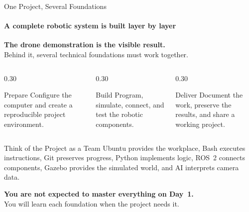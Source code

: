 \begin{frame}{One Project, Several Foundations}
\framesubtitle{A complete robotic system is built layer by layer}

\footnotesize

\begin{center}
    \large
    \textbf{The drone demonstration is the visible result.}\\[0.3em]
    \normalsize
    Behind it, several technical foundations must work together.
\end{center}

\pause

\begin{columns}[T,onlytextwidth]
    \begin{column}{0.30\textwidth}
        \begin{block}{Prepare}
            Configure the computer and create a reproducible project environment.
        \end{block}
    \end{column}
    \hfill
    \begin{column}{0.30\textwidth}
        \begin{block}{Build}
            Program, simulate, connect, and test the robotic components.
        \end{block}
    \end{column}
    \hfill
    \begin{column}{0.30\textwidth}
        \begin{block}{Deliver}
            Document the work, preserve the results, and share a working project.
        \end{block}
    \end{column}
\end{columns}

\pause

\begin{exampleblock}{Think of the Project as a Team}
    Ubuntu provides the workplace, Bash executes instructions, Git preserves progress,
    Python implements logic, ROS~2 connects components, Gazebo provides the simulated
    world, and AI interprets camera data.
\end{exampleblock}

\begin{center}
    \textbf{You are not expected to master everything on Day~1.}\\
    You will learn each foundation when the project needs it.
\end{center}
\end{frame}


